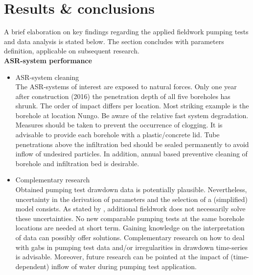 %
%


\section{Results \& conclusions}
\label{section:fieldwork_conclusions}
A brief elaboration on key findings regarding the applied fieldwork pumping tests and data analysis is stated below. The section concludes with parameters definition, applicable on subsequent research. \\

\textbf{ASR-system performance}
\begin{itemize}
\item ASR-system cleaning \\
The ASR-systems of interest are exposed to natural forces. Only one year after construction (2016) the penetration depth of all five boreholes has shrunk. The order of impact differs per location. Most striking example is the borehole at location Nungo. Be aware of the relative fast system degradation. Measures should be taken to prevent the occurrence of clogging. It is advisable to provide each borehole with a plastic/concrete lid. Tube penetrations above the infiltration bed should be sealed permanently to avoid inflow of undesired particles. In addition, annual based preventive cleaning of borehole and infiltration bed is desirable.
         
\item Complementary research \\
Obtained pumping test drawdown data is potentially plausible. Nevertheless, uncertainty in the derivation of parameters and the selection of a (simplified) model consists. As stated by \citet{Kruseman2000}, additional fieldwork does not necessarily solve these uncertainties. No new comparable pumping tests at the same borehole locations are needed at short term. Gaining knowledge on the interpretation of data can possibly offer solutions. Complementary research on how to deal with gabs in pumping test data and/or irregularities in drawdown time-series is advisable. Moreover, future research can be pointed at the impact of (time-dependent) inflow of water during pumping test application. 


\end{itemize}
